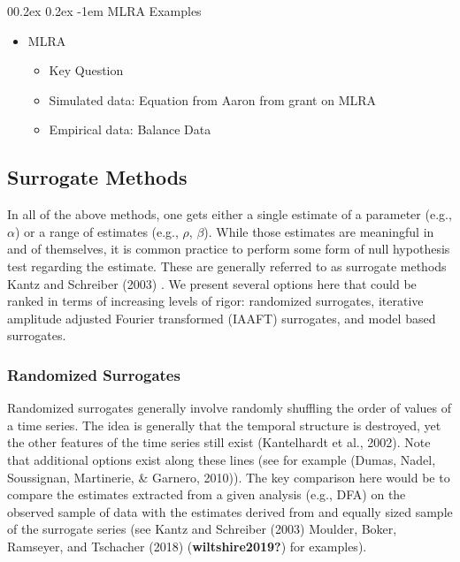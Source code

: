 \documentclass[
  man]{apa6}
\makeatletter
\providecommand{\tightlist}{%
  \setlength{\itemsep}{0pt}\setlength{\parskip}{0pt}}
\let\oldparagraph\paragraph
\renewcommand{\paragraph}[1]{\oldparagraph{#1}\mbox{}}
\renewcommand{\paragraph}{\@startsection{paragraph}{4}{\parindent}%
  {0\baselineskip \@plus 0.2ex \@minus 0.2ex}%
  {-1em}%
  {\normalfont\normalsize\bfseries\itshape\typesectitle}}
\makeatother
\begin{document}
\hypertarget{mlra-examples}{%
\paragraph{MLRA Examples}\label{mlra-examples}}

\begin{itemize}
\item
  MLRA

  \begin{itemize}
  \tightlist
  \item
    Key Question
  \item
    Simulated data: Equation from Aaron from grant on MLRA
  \item
    Empirical data: Balance Data
  \end{itemize}
\end{itemize}

\hypertarget{surrogate-methods}{%
\subsection{Surrogate Methods}\label{surrogate-methods}}

In all of the above methods, one gets either a single estimate of a
parameter (e.g., \(\alpha\)) or a range of estimates (e.g., \(\rho\),
\(\beta\)). While those estimates are meaningful in and of themselves, it
is common practice to perform some form of null hypothesis test
regarding the estimate. These are generally referred to as surrogate
methods Kantz and Schreiber (2003) . We present several options here that could be
ranked in terms of increasing levels of rigor: randomized surrogates,
iterative amplitude adjusted Fourier transformed (IAAFT) surrogates, and
model based surrogates.

\hypertarget{randomized-surrogates}{%
\subsubsection{Randomized Surrogates}\label{randomized-surrogates}}

Randomized surrogates generally involve randomly shuffling the order of
values of a time series. The idea is generally that the temporal
structure is destroyed, yet the other features of the time series still
exist (Kantelhardt et al., 2002). Note that
additional options exist along these lines (see for example
(Dumas, Nadel, Soussignan, Martinerie, \& Garnero, 2010)). The key comparison here
would be to compare the estimates extracted from a given analysis (e.g.,
DFA) on the observed sample of data with the estimates derived from and
equally sized sample of the surrogate series (see Kantz and Schreiber (2003)
Moulder, Boker, Ramseyer, and Tschacher (2018) (\textbf{wiltshire2019?}) for examples).
\end{document}
